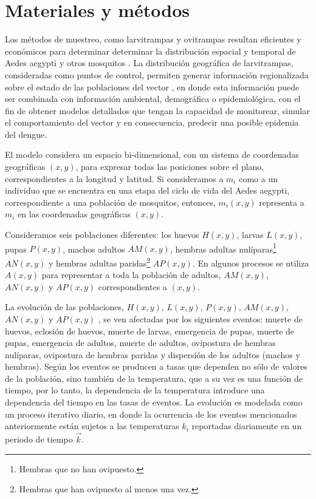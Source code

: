 \section{Materiales y métodos}
Los métodos de muestreo, como larvitrampas y ovitrampas resultan eficientes y económicos para
determinar determinar la distribución espacial y temporal de Aedes aegypti y otros mosquitos
\cite{dengueUruguayCap1, cenaprece2013}. La distribución geográfica de larvitrampas, consideradas
como puntos de control, permiten generar información regionalizada sobre el estado de las
poblaciones del vector \cite{NINO2011}, en donde esta información puede ser combinada con
información ambiental, demográfica o epidemiológica, con el fin de obtener modelos detallados que
tengan la capacidad de monitorear, simular el comportamiento del vector y en consecuencia,
predecir una posible epidemia del dengue.

El modelo considera un espacio bi-dimensional, con un sistema de coordenadas geográficas $(x,y)$,
para expresar todas las posiciones sobre el plano, correspondientes a la longitud y latitud. Si
consideramos a $m_{i}$ como a un individuo que se encuentra en una etapa del ciclo de vida del
Aedes aegypti, correspondiente a una población de mosquitos, entonces, $m_{i}(x,y)$ representa a
$m_{i}$ en las coordenadas geográficas $(x,y)$.

Consideramos seis poblaciones diferentes: los huevos $H(x,y)$, larvas $L(x,y)$, pupas $P(x,y)$,
machos adultos $AM(x,y)$, hembras adultas nulíparas\footnote{Hembras que no han ovipuesto.}
$AN(x,y)$ y hembras adultas paridas\footnote{Hembras que han ovipuesto al menos una vez.} $AP(x,y)$. En algunos procesos se utiliza $A(x, y)$ para representar a toda la población de adultos,
$AM(x,y)$, $AN(x,y)$ y $AP(x,y)$ correspondientes a $(x, y)$.

La evolución de las poblaciones, $H(x,y)$, $L(x,y)$, $P(x,y)$, $AM(x,y)$, $AN(x,y)$ y $AP(x,y)$ ,
se ven afectadas por los siguientes eventos: muerte de huevos, eclosión de huevos, muerte de
larvas, emergencia de pupas, muerte de pupas, emergencia de adultos, muerte de adultos, ovipostura
de hembras nulíparas, ovipostura de hembras paridas y dispersión de los adultos (machos y hembras).
Según \cite{otero2006stochastic} los eventos se producen a tasas que dependen no sólo de valores
de la población, sino también de la temperatura, que a su vez es una función de tiempo, por lo
tanto, la dependencia de la temperatura introduce una dependencia del tiempo en las tasas de
eventos. La evolución es modelada como un proceso iterativo diario, en donde la ocurrencia de los
eventos mencionados anteriormente están sujetos a las temperaturas $k_{i}$ reportadas diariamente
en un periodo de tiempo $\vec{k}$.

